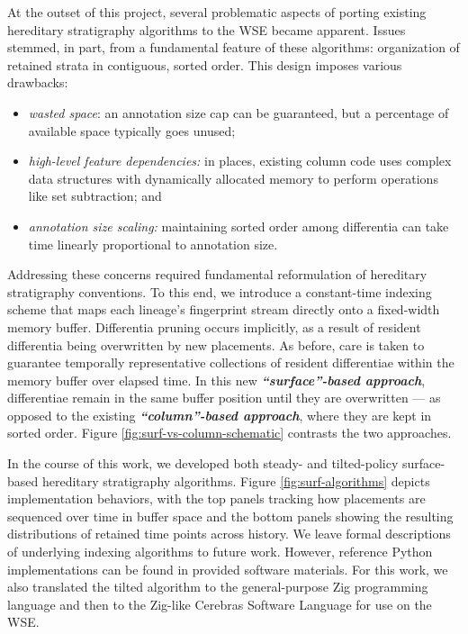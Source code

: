 

At the outset of this project, several problematic aspects of porting existing hereditary stratigraphy algorithms to the WSE became apparent.
Issues stemmed, in part, from a fundamental feature of these algorithms: organization of retained strata in contiguous, sorted order.
This design imposes various drawbacks:
\begin{itemize}
\item \textit{wasted space}: an annotation size cap can be guaranteed, but a percentage of available space typically goes unused;
\item \textit{high-level feature dependencies:} in places, existing column code uses complex data structures with dynamically allocated memory to perform operations like set subtraction; and
\item \textit{annotation size scaling:} maintaining sorted order among differentia can take time linearly proportional to annotation size.
\end{itemize}

\noindent
Addressing these concerns required fundamental reformulation of hereditary stratigraphy conventions.
To this end, we introduce a constant-time indexing scheme that maps each lineage's fingerprint stream directly onto a fixed-width memory buffer.
Differentia pruning occurs implicitly, as a result of resident differentia being overwritten by new placements.
As before, care is taken to guarantee temporally representative collections of resident differentiae within the memory buffer over elapsed time.
In this new \textit{\textbf{``surface''-based approach}}, differentiae remain in the same buffer position until they are overwritten --- as opposed to the existing \textit{\textbf{``column''-based approach}}, where they are kept in sorted order.
Figure \ref{fig:surf-vs-column-schematic} contrasts the two approaches.

In the course of this work, we developed both steady- and tilted-policy surface-based hereditary stratigraphy algorithms.
Figure \ref{fig:surf-algorithms} depicts implementation behaviors, with the top panels tracking how placements are sequenced over time in buffer space and the bottom panels showing the resulting distributions of retained time points across history.
We leave formal descriptions of underlying indexing algorithms to future work.
However, reference Python implementations can be found in provided software materials.
For this work, we also translated the tilted algorithm to the general-purpose Zig programming language and then to the Zig-like Cerebras Software Language for use on the WSE.

